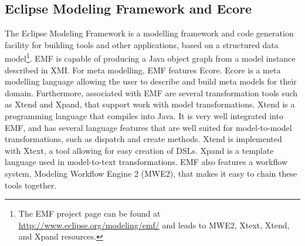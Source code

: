 \subsection{Eclipse Modeling Framework and Ecore}
The Eclipse Modeling Framework is a modelling framework and code generation facility for building tools and other applications, based on a structured data model\footnote{The EMF project page can be found at \url{http://www.eclipse.org/modeling/emf/} and leads to MWE2, Xtext, Xtend, and Xpand resources.}. EMF is capable of producing a Java object graph from a model instance described in XMI. For meta modelling, EMF features Ecore. Ecore is a meta modelling language allowing the user to describe and build meta models for their domain. Furthermore, associated with EMF are several transformation tools such as Xtend and Xpand, that support work with model transformations. Xtend is a programming language that compiles into Java. It is very well integrated into EMF, and has several language features that are well suited for model-to-model transformations, such as dispatch and create methods. Xtend is implemented with Xtext, a tool allowing for easy creation of DSLs. Xpand is a template language used in model-to-text transformations. EMF also features a workflow system, Modeling Workflow Engine 2 (MWE2), that makes it easy to chain these tools together.
